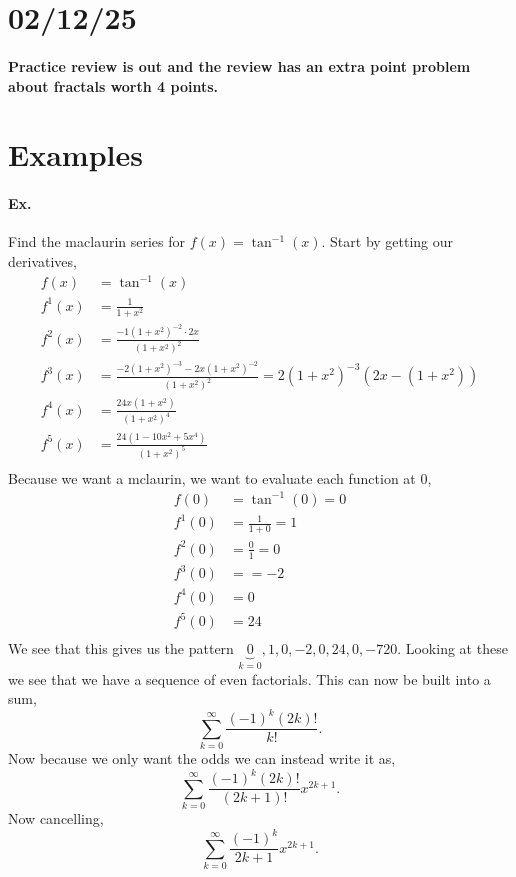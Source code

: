 \section*{02/12/25}%
\label{sec:02/12/25}
\paragraph{Practice review is out and the review has an extra point problem about fractals worth 4 points. }
\section*{Examples}
	\paragraph{Ex.}
	Find the maclaurin series for $ f\left( x \right) = \tan^{ -1 } \left( x \right)  $. Start by getting our derivatives,
	\begin{align*}
		f\left( x \right) &= \tan^{ -1 } \left( x \right) \\
		f^{ 1 }\left( x \right) &= \frac{ 1 }{ 1+x^2 } \\
		f^{ 2 }\left( x \right) &= \frac{ -1\left( 1+x^2 \right) ^{ -2 }\cdot 2x }{ \left( 1+x^2 \right) ^2 } \\
		f^{ 3 }\left( x \right) &= \frac{ -2\left( 1+x^2 \right)^{ -3 } -2x\left( 1+x^2 \right)^{ -2 }  }{ \left( 1+x^2 \right) ^2 } = 2\left( 1+x^2 \right) ^{ -3 }\left( 2x-\left( 1+x^2 \right) \right) \\
		f^{ 4 }\left( x \right) &=  \frac{ 24x\left( 1+x^2 \right)  }{ \left( 1+x^2 \right) ^{ 4 } }  \\
		f^{ 5 }\left( x \right) &= \frac{ 24\left( 1-10x^2+5x^{ 4 } \right)  }{ \left( 1+x^2 \right) ^{ 5 } } \\
	\end{align*}
	Because we want a mclaurin, we want to evaluate each function at 0,
	\begin{align*}
		f\left( 0 \right) &= \tan^{ -1 } \left( 0 \right) = 0 \\
		f^{ 1 }\left( 0 \right) &= \frac{ 1 }{ 1+0 } = 1 \\
		f^{ 2 }\left( 0 \right) &= \frac{ 0 }{ 1 } = 0 \\
		f^{ 3 }\left( 0 \right) &= = -2 \\
		f^{ 4 }\left( 0 \right) &= 0 \\
		f^{ 5 }\left( 0 \right) &= 24 \\
	\end{align*}
	We see that this gives us the pattern $ \underbrace{ 0 }_{ k=0 } ,1,0,-2,0,24,0,-720 $. Looking at these we see that we have a sequence of even factorials. This can now be built into a sum,
	\[
	\sum_{ k=0 } ^{ \infty } \frac{ \left( -1 \right) ^{ k }\left( 2k \right) ! }{ k! }
	.\] 
	Now because we only want the odds we can instead write it as,
	\[
	\sum_{ k=0 } ^{ \infty } \frac{ \left( -1 \right) ^{ k }\left( 2k \right) ! }{ \left(2k+1\right)! }x^{ 2k+1 }
	.\] 
	Now cancelling,
	\[
	\sum_{ k=0 } ^{ \infty } \frac{ \left( -1 \right) ^{ k } }{ 2k+1 }x^{ 2k+1 }
	.\] 
